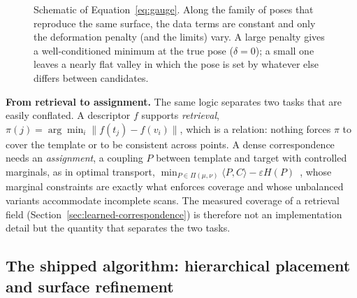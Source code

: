 \begin{figure}[!htb]
\centering
{}
\caption[Pose--deformation equivalence]{Schematic of Equation~\eqref{eq:gauge}.
Along the family of poses that reproduce the same surface, the data terms are
constant and only the deformation penalty (and the limits) vary. A large
penalty gives a well-conditioned minimum at the true pose ($\delta=0$); a small
one leaves a nearly flat valley in which the pose is set by whatever else
differs between candidates.}
\label{fig:gauge}
\end{figure}

\textbf{From retrieval to assignment.} The same logic separates two tasks that
are easily conflated. A descriptor $f$ supports \emph{retrieval},
$\pi(j)=\arg\min_i\|f(t_j)-f(v_i)\|$, which is a relation: nothing forces $\pi$ to
cover the template or to be consistent across points. A dense correspondence
needs an \emph{assignment}, a coupling $P$ between template and target with
controlled marginals, as in optimal transport,
$\min_{P\in\Pi(\mu,\nu)}\langle P,C\rangle-\varepsilon H(P)$~\cite{ot}, whose
marginal constraints are exactly what enforces coverage and whose unbalanced
variants accommodate incomplete scans. The measured coverage of a retrieval
field (Section~\ref{sec:learned-correspondence}) is therefore not an
implementation detail but the quantity that separates the two tasks.

\subsection{The shipped algorithm: hierarchical placement and surface refinement}
\label{sec:algorithm}

